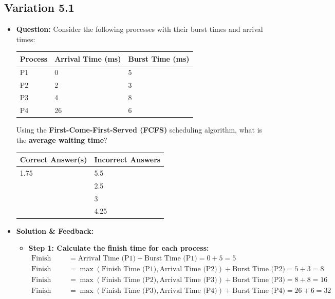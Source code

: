 \subsection{Variation 5.1}
\begin{itemize}
    \item \textbf{Question:} Consider the following processes with their burst times and arrival times:
    
    \begin{tabular}{|l|l|l|}
        \hline
        \textbf{Process} & \textbf{Arrival Time (ms)} & \textbf{Burst Time (ms)} \\
        \hline
        P1 & 0 & 5 \\
        P2 & 2 & 3 \\
        P3 & 4 & 8 \\
        P4 & 26 & 6 \\
        \hline
    \end{tabular}
    
    Using the \textbf{First-Come-First-Served (FCFS)} scheduling algorithm, what is the \textbf{average waiting time}?
    
    \begin{tabular}{|l|l|}
        \hline
        \textbf{Correct Answer(s)} & \textbf{Incorrect Answers} \\
        \hline
        1.75 & 5.5 \\
         & 2.5 \\
         & 3 \\
         & 4.25 \\
        \hline
    \end{tabular}
    
    \item \textbf{Solution \& Feedback:}
    \begin{itemize}
        \item \textbf{Step 1: Calculate the finish time for each process:}
        \begin{align*}
            \text{Finish Time (P1)} &= \text{Arrival Time (P1)} + \text{Burst Time (P1)} = 0 + 5 = 5 \\
            \text{Finish Time (P2)} &= \max(\text{Finish Time (P1)}, \text{Arrival Time (P2)}) + \text{Burst Time (P2)} = 5 + 3 = 8 \\
            \text{Finish Time (P3)} &= \max(\text{Finish Time (P2)}, \text{Arrival Time (P3)}) + \text{Burst Time (P3)} = 8 + 8 = 16 \\
            \text{Finish Time (P4)} &= \max(\text{Finish Time (P3)}, \text{Arrival Time (P4)}) + \text{Burst Time (P4)} = 26 + 6 = 32 \\
        \end{align*}
        

\end{itemize}
\end{itemize}
